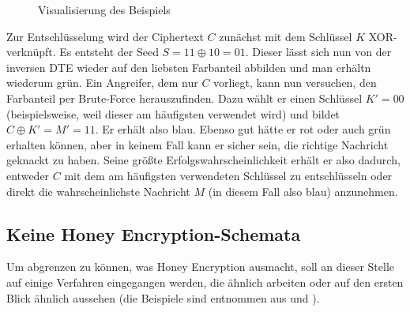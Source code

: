 \begin{figure}[!h]
\center
{}
\caption{Visualisierung des Beispiels}
\label{fig:Beispiel}
\end{figure}

Zur Entschlüsselung wird der Ciphertext \(C\) zunächst mit dem Schlüssel \(K\) XOR-verknüpft. Es entsteht der Seed \(S = 11 \oplus 10 = 01\). Dieser lässt sich nun von der inversen DTE wieder auf den liebsten Farbanteil abbilden und man erhältn wiederum grün. Ein Angreifer, dem nur \(C\) vorliegt, kann nun versuchen, den Farbanteil per Brute-Force herauszufinden. Dazu wählt er einen Schlüssel \(K'=00\) (beispielsweise, weil dieser am häufigsten verwendet wird) und bildet \(C \oplus K' = M' = 11\). Er erhält also blau. Ebenso gut hätte er rot oder auch grün erhalten können, aber in keinem Fall kann er sicher sein, die richtige Nachricht geknackt zu haben. Seine größte Erfolgswahrscheinlichkeit erhält er also dadurch, entweder \(C\) mit dem am häufigsten verwendeten Schlüssel zu entschlüsseln oder direkt die wahrscheinlichste Nachricht \(M\) (in diesem Fall also blau) anzunehmen.

\subsection{Keine Honey Encryption-Schemata}

Um abgrenzen zu können, was Honey Encryption ausmacht, soll an dieser Stelle auf einige Verfahren eingegangen werden, die ähnlich arbeiten oder auf den ersten Blick ähnlich aussehen (die Beispiele sind entnommen aus \cite{EURO2014} und \cite{IEEE2014}).

